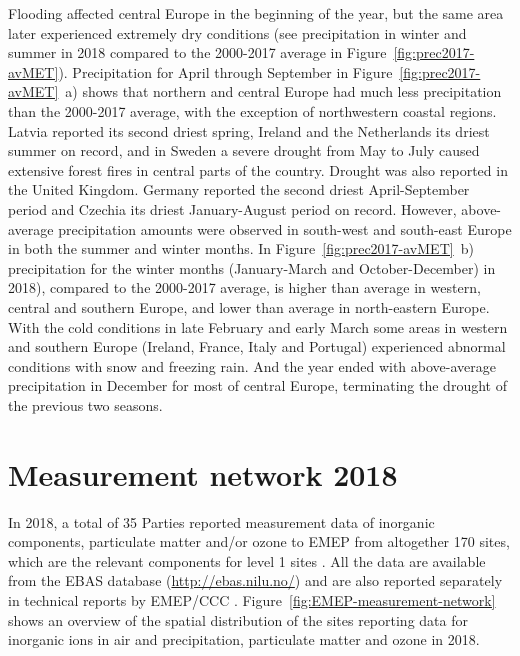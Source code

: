 Flooding affected central Europe in the beginning of the year, but the same area later experienced extremely dry conditions (see precipitation in winter and summer in 2018 compared to the 2000-2017 average in Figure~\ref{fig:prec2017-avMET}). Precipitation for April through September in Figure~\ref{fig:prec2017-avMET}~a) shows that northern and central Europe had much less precipitation than the 2000-2017 average, with the exception of northwestern coastal regions. Latvia reported its second driest spring, Ireland and the Netherlands its driest summer on record, and in Sweden a severe drought from May to July caused extensive forest fires in central parts of the country. Drought was also reported in the United Kingdom. Germany reported the second driest April-September period and Czechia its driest January-August period on record.
However, above-average precipitation amounts were observed in south-west and south-east Europe in both the summer and winter months. In Figure~\ref{fig:prec2017-avMET}~b) precipitation for the winter months (January-March and October-December) in 2018), compared to the 2000-2017 average, is higher than average in western, central and southern Europe, and lower than average in north-eastern Europe. With the cold conditions in late February and early March some areas in western and southern Europe (Ireland, France, Italy and Portugal) experienced abnormal conditions with snow and freezing rain. And the year ended with above-average precipitation in December for most of central Europe, terminating the drought of the previous two seasons.


\section{Measurement network 2018} 
\label{Obs_2018}

In 2018, a total of 35 Parties reported measurement data of inorganic components, particulate matter and/or ozone to EMEP from altogether 170 sites, which are the relevant components for level 1 sites \citep{MonStrat2019}. 
All the data are available from the EBAS database (\url{http://ebas.nilu.no/}) and are also reported separately in technical reports by EMEP/CCC \citep{Hjellbrekke2020a,Hjellbrekke2020b}. Figure~\ref{fig:EMEP-measurement-network} shows an overview of the spatial distribution of the sites reporting data for inorganic ions in air and precipitation, particulate matter and ozone in 2018.

